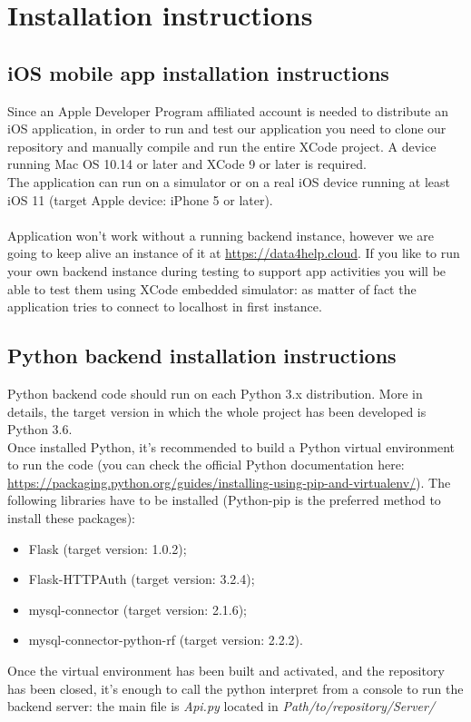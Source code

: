 \documentclass{article}
\begin{document}
\newpage
\section{Installation instructions}

\subsection{iOS mobile app installation instructions}
Since an Apple Developer Program affiliated account is needed to distribute an iOS application, in order to run and test our application you need to clone our repository and manually compile and run the entire XCode project. A device running Mac OS 10.14 or later and XCode 9 or later is required. \\
	The application can run on a simulator or on a real iOS device running at least iOS 11 (target Apple device: iPhone 5 or later).	\\\\
	Application won't work without a running backend instance, however we are going to keep alive an instance of it at \url{https://data4help.cloud}.
	If you like to run your own backend instance during testing to support app activities you will be able to test them using XCode embedded simulator: as matter of fact the application tries to connect to localhost in first instance.
	
\subsection{Python backend installation instructions}
Python backend code should run on each Python 3.x distribution. More in details, the target version in which the whole project has been developed is Python 3.6.\\
Once installed Python, it's recommended to build a Python virtual environment to run the code (you can check the official Python documentation here: \url{https://packaging.python.org/guides/installing-using-pip-and-virtualenv/}). The following libraries have to be installed (Python-pip is the preferred method to install these packages):
\begin{itemize}
	\item Flask (target version: 1.0.2);
	\item Flask-HTTPAuth (target version: 3.2.4);
	\item mysql-connector (target version: 2.1.6);
	\item mysql-connector-python-rf (target version: 2.2.2).
\end{itemize}
Once the virtual environment has been built and activated, and the repository has been closed, it's enough to call the python interpret from a console to run the backend server: the main file is \textit{Api.py} located in \textit{Path/to/repository/Server/} 
\end{document}
